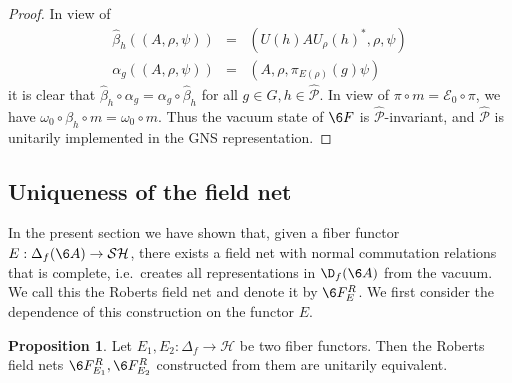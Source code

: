 \documentclass[12pt]{article}
\theoremstyle{definition}
\newtheorem{prop}[thm]{Proposition}
\theoremstyle{definition}
\theoremstyle{remark}
\def\2#1{{\mathcal #1}}
\newcommand{\rarr}{\rightarrow}
\begin{document}
\begin{proof}
In view of 
\begin{eqnarray*} \widehat{\beta}_h((A,\rho,\psi))  &=&  (U(h)AU_\rho(h)^*,\rho,\psi) \\
    \alpha_g((A,\rho,\psi)) &=& (A,\rho,\pi_{E(\rho)}(g)\psi) \end{eqnarray*}
it is clear that $\widehat{\beta}_h\circ\alpha_g=\alpha_g\circ\widehat{\beta}_h$ for all 
$g\in G, h\in\widehat{\2P}$. In view of $\pi\circ m=\2E_0\circ\pi$, we have
$\omega_0\circ\beta_h\circ m=\omega_0\circ m$. 
Thus the vacuum state of $\6F$ is $\widehat{\2P}$-invariant, and $\widehat{\2P}$ is unitarily
implemented in the GNS representation. 
\end{proof}



\subsection{Uniqueness of the field net}
In the present section we have shown that, given a fiber functor $E:\Delta_f(\6A)\rarr\2S\2H$, there
exists a field net with normal commutation relations that is complete, i.e.\ creates all
representations in $\D_f(\6A)$ from the vacuum. We call this the Roberts field net and denote it by
$\6F^R_E$. We first consider the dependence of this construction on the functor $E$.

\begin{prop}
Let $E_1,E_2:\Delta_f\rarr\2H$ be two fiber functors. Then the Roberts field nets
$\6F^R_{E_1},\6F^R_{E_2}$ constructed from them are unitarily equivalent.
\end{prop}
\end{document}
